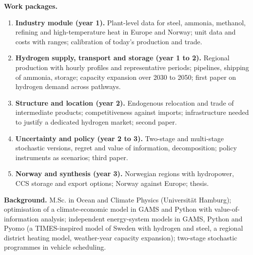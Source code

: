 \documentclass[10.5pt,a4paper]{article}
\begin{document}
\textbf{Work packages.}
\begin{enumerate}
\item \textbf{Industry module (year 1).} Plant-level data for steel, ammonia, methanol, refining and high-temperature heat in Europe and Norway; unit data and costs with ranges; calibration of today's production and trade.
\item \textbf{Hydrogen supply, transport and storage (year 1 to 2).} Regional production with hourly profiles and representative periods; pipelines, shipping of ammonia, storage; capacity expansion over 2030 to 2050; first paper on hydrogen demand across pathways.
\item \textbf{Structure and location (year 2).} Endogenous relocation and trade of intermediate products; competitiveness against imports; infrastructure needed to justify a dedicated hydrogen market; second paper.
\item \textbf{Uncertainty and policy (year 2 to 3).} Two-stage and multi-stage stochastic versions, regret and value of information, decomposition; policy instruments as scenarios; third paper.
\item \textbf{Norway and synthesis (year 3).} Norwegian regions with hydropower, CCS storage and export options; Norway against Europe; thesis.
\end{enumerate}

\textbf{Background.} M.Sc. in Ocean and Climate Physics (Universit\"at Hamburg); optimisation of a climate-economic model in GAMS and Python with value-of-information analysis; independent energy-system models in GAMS, Python and Pyomo (a TIMES-inspired model of Sweden with hydrogen and steel, a regional district heating model, weather-year capacity expansion); two-stage stochastic programmes in vehicle scheduling.
\end{document}
